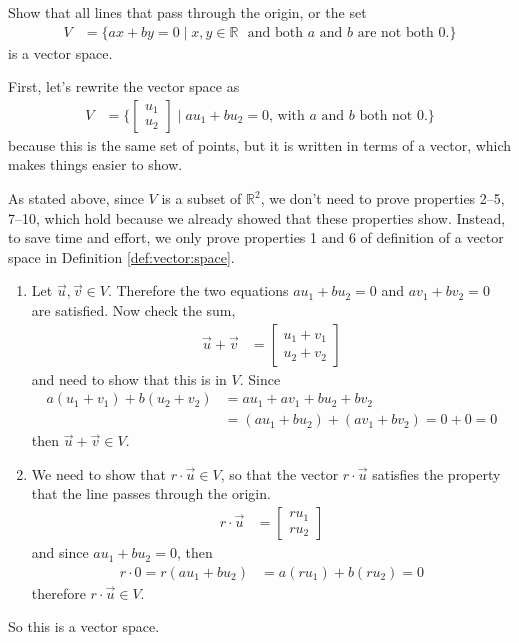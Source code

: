 \begin{example} \label{ex:lines:through:origin:vector:space}

Show that all lines that pass through the origin, or the set
%
\begin{align*}
V & = \{ ax + by = 0\; | \; x, y \in \mathbb{R} \text{~ and both $a$ and $b$ are not both 0.} \} 
\end{align*}
%
is a vector space. 

\solution

First, let's rewrite the vector space as 
\begin{align*}
V & = \{ \begin{bmatrix}
u_1 \\ u_2 
\end{bmatrix} \; | \; \text{$au_1+bu_2=0$, with $a$ and $b$ both not 0.}\}
\end{align*}
because this is the same set of points, but it is written in terms of a vector, which makes things easier to show. 

As stated above, since $V$ is a subset of $\mathbb{R}^2$, we don't need to prove properties 2--5, 7--10, which hold because we already showed that these properties show.  Instead, to save time and effort, we only prove properties 1 and 6 of definition of a vector space in Definition \ref{def:vector:space}.  

\begin{enumerate}
\item Let $\vec{u}, \vec{v} \in V$.  Therefore the two equations $au_1+bu_2=0$ and $av_1+bv_2=0$ are satisfied.  Now check the sum, 
%
\begin{align*}
\vec{u} + \vec{v} & = \begin{bmatrix}
u_1 + v_1 \\
u_2 + v_2 
\end{bmatrix}
\end{align*}
and need to show that this is in $V$.  Since 
\begin{align*}
a(u_1 + v_1) + b(u_2+v_2) & = au_1 + av_1 + bu_2 + bv_2  \\
& = 
(au_1 + bu_2) + (av_1 + bv_2) = 0 + 0 = 0
\end{align*}
then $\vec{u}+\vec{v} \in V$.  

\setcounter{enumi}{5}

\item We need to show that $r \cdot \vec{u} \in V$, so that the vector $r\cdot\vec{u}$ satisfies the property that the line passes through the origin.  
%
\begin{align*}
r \cdot \vec{u} & = \begin{bmatrix}
r u_1 \\ r u_2 
\end{bmatrix}
\end{align*}
and since $au_1 + bu_2 = 0$, then 
\begin{align*}
r \cdot 0  = r(au_1 + bu_2) & = a (ru_1) + b (r u_2)  =0 
\end{align*}
therefore $r \cdot \vec{u} \in V$.  
\end{enumerate}
So this is a vector space.  


\end{example}

